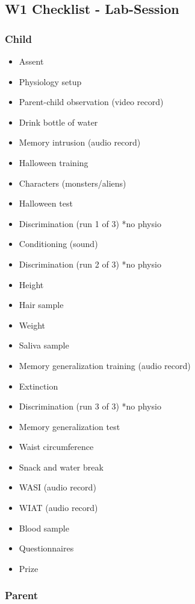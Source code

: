 \documentclass[]{book}
\providecommand{\tightlist}{%
  \setlength{\itemsep}{0pt}\setlength{\parskip}{0pt}}
\begin{document}
\hypertarget{w1-checklist---lab-session}{%
\subsection{W1 Checklist - Lab-Session}\label{w1-checklist---lab-session}}

\hypertarget{child-1}{%
\subsubsection{Child}\label{child-1}}

\begin{itemize}
\tightlist
\item
  Assent
\item
  Physiology setup
\item
  Parent-child observation (video record)
\item
  Drink bottle of water
\item
  Memory intrusion (audio record)
\item
  Halloween training
\item
  Characters (monsters/aliens)
\item
  Halloween test
\item
  Discrimination (run 1 of 3) *no physio
\item
  Conditioning (sound)
\item
  Discrimination (run 2 of 3) *no physio
\item
  Height
\item
  Hair sample
\item
  Weight
\item
  Saliva sample
\item
  Memory generalization training (audio record)
\item
  Extinction
\item
  Discrimination (run 3 of 3) *no physio
\item
  Memory generalization test
\item
  Waist circumference
\item
  Snack and water break
\item
  WASI (audio record)
\item
  WIAT (audio record)
\item
  Blood sample
\item
  Questionnaires
\item
  Prize
\end{itemize}

\hypertarget{parent-1}{%
\subsubsection{Parent}\label{parent-1}}
\end{document}
